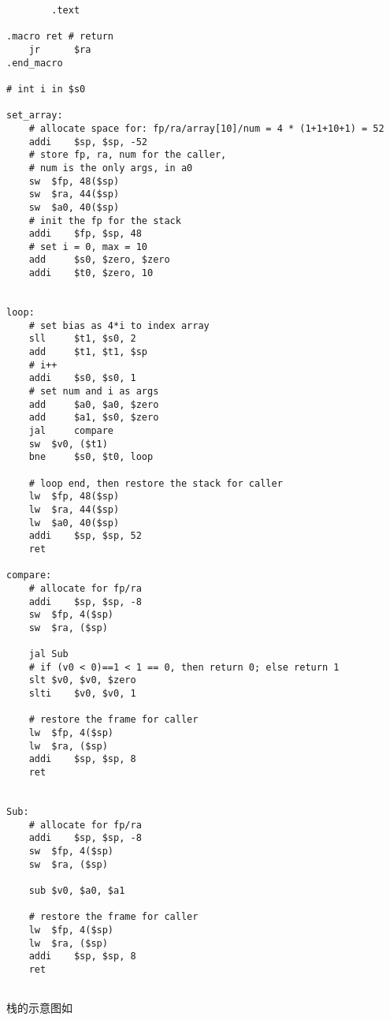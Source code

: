\documentclass[lang=cn,11pt,a4paper,cite=authoryear]{elegantpaper}
\begin{document}


\begin{lstlisting}
		.text

.macro ret # return 
	jr   	$ra
.end_macro 

# int i in $s0

set_array:
	# allocate space for: fp/ra/array[10]/num = 4 * (1+1+10+1) = 52
	addi 	$sp, $sp, -52 
	# store fp, ra, num for the caller,
	# num is the only args, in a0
	sw	$fp, 48($sp)
	sw	$ra, 44($sp)
	sw	$a0, 40($sp)
	# init the fp for the stack
	addi	$fp, $sp, 48 
	# set i = 0, max = 10
	add 	$s0, $zero, $zero 
	addi 	$t0, $zero, 10 
	
	
loop:	
	# set bias as 4*i to index array 
	sll 	$t1, $s0, 2
	add 	$t1, $t1, $sp 
	# i++ 
	addi 	$s0, $s0, 1 
	# set num and i as args
	add 	$a0, $a0, $zero 
	add 	$a1, $s0, $zero
	jal 	compare
	sw 	$v0, ($t1) 
	bne 	$s0, $t0, loop
	
	# loop end, then restore the stack for caller
	lw	$fp, 48($sp)
	lw	$ra, 44($sp)
	lw	$a0, 40($sp)
	addi 	$sp, $sp, 52
	ret 

compare:
	# allocate for fp/ra
	addi 	$sp, $sp, -8
	sw	$fp, 4($sp)
	sw	$ra, ($sp)
	
	jal	Sub
	# if (v0 < 0)==1 < 1 == 0, then return 0; else return 1
	slt	$v0, $v0, $zero
	slti 	$v0, $v0, 1
	
	# restore the frame for caller
	lw 	$fp, 4($sp)
	lw 	$ra, ($sp)
	addi 	$sp, $sp, 8
	ret
	

Sub: 
	# allocate for fp/ra
	addi 	$sp, $sp, -8
	sw	$fp, 4($sp)
	sw	$ra, ($sp)
	
	sub	$v0, $a0, $a1
	
	# restore the frame for caller
	lw 	$fp, 4($sp)
	lw 	$ra, ($sp)
	addi 	$sp, $sp, 8
	ret
	
\end{lstlisting}

栈的示意图如 


\end{document}
